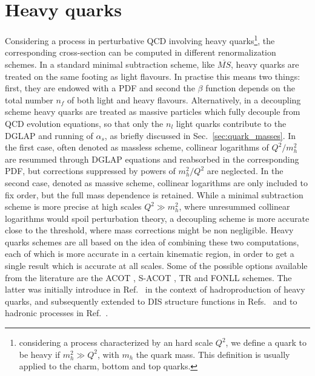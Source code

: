 \section{Heavy quarks}
\label{sec:fonll}
Considering a process in perturbative QCD involving heavy quarks\footnote{considering a process 
characterized by an hard scale $Q^2$,
we define a quark to be heavy if $m_h^2\gg Q^2$, with $m_h$ the quark mass. 
This definition is usually applied to the charm, bottom and top quarks.}, the corresponding cross-section
can be computed  in different renormalization schemes. In a standard minimal subtraction scheme, like $\overline{MS}$,
heavy quarks are treated on the same footing
as light flavours. 
In practise this means two things: first, they are endowed with a PDF and second 
the $\beta$ function depends on the total number $n_f$ of both light and heavy flavours. 
Alternatively, in a decoupling scheme heavy quarks are treated as massive particles 
which fully decouple from QCD evolution equations, 
so that only the $n_l$ light quarks contribute to the DGLAP and running of $\alpha_s$,
as briefly discussed in Sec.~\ref{sec:quark_masses}.
In the first case, often denoted as massless scheme, collinear logarithms of $Q^2/m_h^2$
are resummed through DGLAP equations and reabsorbed in the corresponding PDF, but corrections
suppressed by powers of $m_h^2/Q^2$ are neglected.
In the second case, denoted as massive scheme, collinear logarithms are only included to fix order, but the 
full mass dependence is retained.
While a minimal subtraction scheme is more precise at high scales $Q^2 \gg m_h^2$, where unresummed collinear logarithms
would spoil perturbation theory, a decoupling scheme is more accurate close to the threshold, where mass
corrections might be non negligible.
Heavy quarks schemes are all based on the idea of combining these two computations, each of which is more accurate 
in a certain kinematic region, in order to get a single result which is accurate at all scales.
Some of the possible options available from the literature are 
the ACOT \cite{Aivazis:1993pi, Aivazis:1993kh, Tung:2001mv}, S-ACOT \cite{Kramer:2000hn}, TR \cite{Thorne:1997ga}
and FONLL schemes.
The latter was initially introduce in Ref.~\cite{Cacciari:1998it} in the context of hadroproduction of heavy quarks, and subsequently 
extended to DIS structure functions in Refs.~\cite{Forte:2010ta} and to hadronic processes in Ref.~\cite{Forte:2015hba}.

